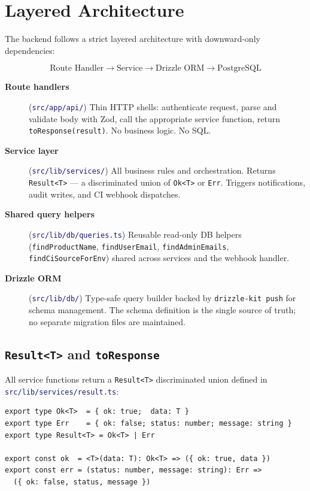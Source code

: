 \documentclass[12pt,a4paper,twoside]{report}
\newcommand{\code}[1]{\texttt{#1}}
\newcommand{\file}[1]{\texttt{\textcolor{MidnightBlue}{#1}}}
\begin{document}
\section{Layered Architecture}

The backend follows a strict layered architecture with downward-only
dependencies:

\[
\text{Route Handler} \rightarrow \text{Service} \rightarrow \text{Drizzle ORM} \rightarrow \text{PostgreSQL}
\]

\begin{description}
  \item[\textbf{Route handlers}] (\file{src/app/api/})
    Thin HTTP shells: authenticate request, parse and validate body with
    Zod, call the appropriate service function, return \code{toResponse(result)}.
    No business logic. No SQL.
  \item[\textbf{Service layer}] (\file{src/lib/services/})
    All business rules and orchestration. Returns \code{Result<T>} —
    a discriminated union of \code{Ok<T>} or \code{Err}. Triggers
    notifications, audit writes, and CI webhook dispatches.
  \item[\textbf{Shared query helpers}] (\file{src/lib/db/queries.ts})
    Reusable read-only DB helpers (\code{findProductName},
    \code{findUserEmail}, \code{findAdminEmails},
    \code{findCiSourceForEnv}) shared across services and the
    webhook handler.
  \item[\textbf{Drizzle ORM}] (\file{src/lib/db/})
    Type-safe query builder backed by \code{drizzle-kit push} for
    schema management. The schema definition is the single source of
    truth; no separate migration files are maintained.
\end{description}

\subsection*{\texttt{Result<T>} and \texttt{toResponse}}

All service functions return a \code{Result<T>} discriminated union
defined in \file{src/lib/services/result.ts}:

\begin{lstlisting}[style=ts]
export type Ok<T>  = { ok: true;  data: T }
export type Err    = { ok: false; status: number; message: string }
export type Result<T> = Ok<T> | Err

export const ok  = <T>(data: T): Ok<T> => ({ ok: true, data })
export const err = (status: number, message: string): Err =>
  ({ ok: false, status, message })
\end{lstlisting}
\end{document}
